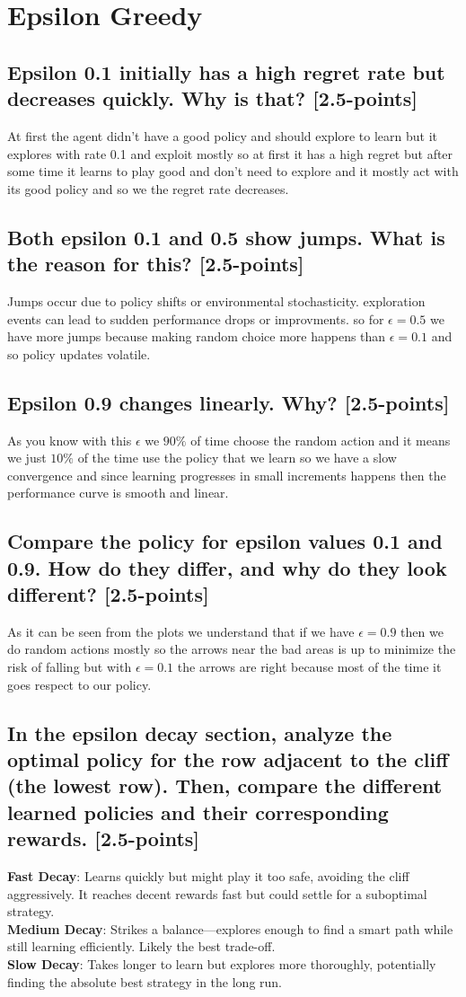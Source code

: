 \documentclass[12pt]{article}
\begin{document}
{{{				\section{Epsilon Greedy}
				\subsection{Epsilon 0.1 initially has a high regret rate but decreases quickly. Why is that? [2.5-points]}
				At first the agent didn't have a good policy and should explore to learn but it explores with rate 0.1 and exploit mostly so at first it has a high regret but after some time it learns to play good and don't need to explore and it mostly act with its good policy and so we the regret rate decreases.
				\subsection{Both epsilon 0.1 and 0.5 show jumps. What is the reason for this? [2.5-points]}
				Jumps occur due to policy shifts or environmental stochasticity. exploration events can lead to sudden performance drops or improvments.
				so for $\epsilon=0.5$ we have more jumps because making random choice more happens than $\epsilon=0.1$ and so policy updates volatile.
				\subsection{Epsilon 0.9 changes linearly. Why? [2.5-points]}
				As you know with this $\epsilon$ we $90\%$ of time choose the random action and it means we just $10\%$ of the time use the policy that we learn so we have a slow convergence and since learning progresses in small increments happens then the performance curve is  smooth and linear.
				\subsection{Compare the policy for epsilon values 0.1 and 0.9. How do they differ, and why do they look different? [2.5-points]}
				As it can be seen from the plots we understand that if we have $\epsilon=0.9$ then we do random actions mostly so the arrows near the bad areas is up to minimize the risk of falling but with $\epsilon=0.1$ the arrows are right because most of the time it goes respect to our policy.
				\subsection{In the epsilon decay section, analyze the optimal policy for the row adjacent to the cliff (the lowest row). Then, compare the different learned policies and their corresponding rewards. [2.5-points]}
				\textbf{Fast Decay}: Learns quickly but might play it too safe, avoiding the cliff aggressively. It reaches decent rewards fast but could settle for a suboptimal strategy.\\
				\textbf{Medium Decay}: Strikes a balance—explores enough to find a smart path while still learning efficiently. Likely the best trade-off.\\
				\textbf{Slow Decay}: Takes longer to learn but explores more thoroughly, potentially finding the absolute best strategy in the long run.
}}}
\end{document}

